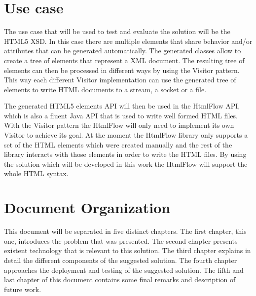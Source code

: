 \section{Use case}

The use case that will be used to test and evaluate the solution will be the \ac{HTML}5 \ac{XSD}. In this case there are multiple elements that share behavior and/or attributes that can be generated automatically. The generated classes allow to create a tree of elements that represent a \ac{XML} document. The resulting tree of elements can then be processed in different ways by using the Visitor pattern. This way each different Visitor implementation can use the generated tree of elements to write \ac{HTML} documents to a stream, a socket or a file. 

\noindent
The generated \ac{HTML}5 elements \ac{API} will then be used in the HtmlFlow \ac{API}, which is also a fluent Java \ac{API} that is used to write well formed \ac{HTML} files. With the Visitor pattern the HtmlFlow will only need to implement its own Visitor to achieve its goal. At the moment the HtmlFlow library only supports a set of the \ac{HTML} elements which were created manually and the rest of the library interacts with those elements in order to write the \ac{HTML} files. By using the solution which will be developed in this work the HtmlFlow will support the whole \ac{HTML} syntax. 

\section{Document Organization}

This document will be separated in five distinct chapters. The first chapter, this one, introduces the problem that was presented. The second chapter presents existent technology that is relevant to this solution. The third chapter explains in detail the different components of the suggested solution. The fourth chapter approaches the deployment and testing of the suggested solution. The fifth and last chapter of this document contains some final remarks and description of future work.